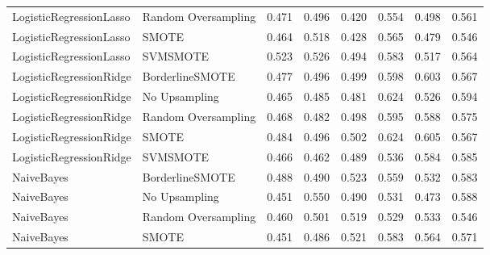 \begin{tabular}{llllllll}
     LogisticRegressionLasso & Random Oversampling & 0.471 &                     0.496 &                 0.420 &                  0.554 &                                   0.498 &     0.561 \\
     LogisticRegressionLasso &               SMOTE & 0.464 &                     0.518 &                 0.428 &                  0.565 &                                   0.479 &     0.546 \\
     LogisticRegressionLasso &            SVMSMOTE & 0.523 &                     0.526 &                 0.494 &                  0.583 &                                   0.517 &     0.564 \\
     LogisticRegressionRidge &     BorderlineSMOTE & 0.477 &                     0.496 &                 0.499 &                  0.598 &                                   0.603 &     0.567 \\
     LogisticRegressionRidge &       No Upsampling & 0.465 &                     0.485 &                 0.481 &                  0.624 &                                   0.526 &     0.594 \\
     LogisticRegressionRidge & Random Oversampling & 0.468 &                     0.482 &                 0.498 &                  0.595 &                                   0.588 &     0.575 \\
     LogisticRegressionRidge &               SMOTE & 0.484 &                     0.496 &                 0.502 &                  0.624 &                                   0.605 &     0.567 \\
     LogisticRegressionRidge &            SVMSMOTE & 0.466 &                     0.462 &                 0.489 &                  0.536 &                                   0.584 &     0.585 \\
                  NaiveBayes &     BorderlineSMOTE & 0.488 &                     0.490 &                 0.523 &                  0.559 &                                   0.532 &     0.583 \\
                  NaiveBayes &       No Upsampling & 0.451 &                     0.550 &                 0.490 &                  0.531 &                                   0.473 &     0.588 \\
                  NaiveBayes & Random Oversampling & 0.460 &                     0.501 &                 0.519 &                  0.529 &                                   0.533 &     0.546 \\
                  NaiveBayes &               SMOTE & 0.451 &                     0.486 &                 0.521 &                  0.583 &                                   0.564 &     0.571 \\

\end{tabular}
